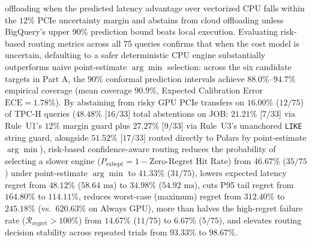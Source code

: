 \documentclass[10pt,a4paper]{article}
\begin{document}
\begin{enumerate}[leftmargin=1.5em,itemsep=0.8pt]
offloading when the predicted latency advantage over vectorized CPU falls within the $12\%$ PCIe uncertainty margin and abstains from cloud offloading unless BigQuery's upper 90\% prediction bound beats local execution. Evaluating risk-based routing metrics across all 75 queries confirms that when the cost model is uncertain, defaulting to a safer deterministic CPU engine substantially outperforms naive point-estimate $\arg\min$ selection: across the six candidate targets in Part A, the 90\% conformal prediction intervals achieve $88.0\%\text{--}94.7\%$ empirical coverage (mean coverage $90.9\%$, Expected Calibration Error $\text{ECE}=1.78\%$). By abstaining from risky GPU PCIe transfers on $16.00\%$ ($12/75$) of TPC-H queries ($48.48\%$ [$16/33$] total abstentions on JOB: $21.21\%$ [$7/33$] via Rule~U1's $12\%$ margin guard plus $27.27\%$ [$9/33$] via Rule~U3's unanchored \texttt{LIKE} string guard, alongside $51.52\%$ [$17/33$] routed directly to Polars by point-estimate $\arg\min$), risk-based confidence-aware routing reduces the probability of selecting a slower engine ($P_{\text{subopt}} = 1 - \text{Zero-Regret Hit Rate}$) from $46.67\%$ ($35/75$) under point-estimate $\arg\min$ to $41.33\%$ ($31/75$), lowers expected latency regret from $48.12\%$ ($58.64\text{ ms}$) to $34.98\%$ ($54.92\text{ ms}$), cuts P95 tail regret from $164.80\%$ to $114.11\%$, reduces worst-case (maximum) regret from $312.40\%$ to $245.18\%$ (vs.\ $620.63\%$ on Always GPU), more than halves the high-regret failure rate ($\mathcal{R}_{\text{regret}} > 100\%$) from $14.67\%$ ($11/75$) to $6.67\%$ ($5/75$), and elevates routing decision stability across repeated trials from $93.33\%$ to $98.67\%$.

\end{enumerate}
\end{document}
